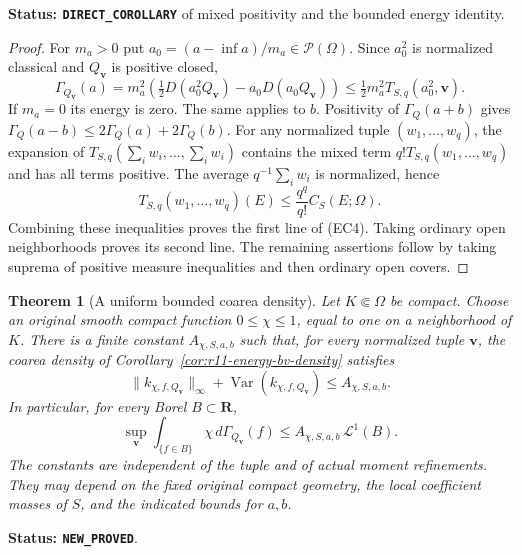 \documentclass[11pt,a4paper]{article}
\numberwithin{equation}{section}
\newtheorem{theorem}{Theorem}[section]
\theoremstyle{definition}
\theoremstyle{remark}
\begin{document}
\noindent\textbf{Status: \texttt{DIRECT\_COROLLARY}} of mixed
positivity and the bounded energy identity.

\begin{proof}
For $m_a>0$ put $a_0=(a-\inf a)/m_a\in\mathcal P(\Omega)$.
Since $a_0^2$ is normalized classical and $Q_{\mathbf v}$ is
positive closed,
\[
 \Gamma_{Q_{\mathbf v}}(a)
  =m_a^2\left(\tfrac12D(a_0^2Q_{\mathbf v})
                              -a_0D(a_0Q_{\mathbf v})\right)
  \le\tfrac12m_a^2T_{S,q}(a_0^2,\mathbf v).
\]
If $m_a=0$ its energy is zero.  The same applies to $b$.
Positivity of $\Gamma_Q(a+b)$ gives
$\Gamma_Q(a-b)\le2\Gamma_Q(a)+2\Gamma_Q(b)$.
For any normalized tuple $(w_1,\ldots,w_q)$, the expansion of
$T_{S,q}(\sum_iw_i,\ldots,\sum_iw_i)$ contains the mixed
term $q!T_{S,q}(w_1,\ldots,w_q)$ and has all terms positive.
The average $q^{-1}\sum_iw_i$ is normalized, hence
\[
 T_{S,q}(w_1,\ldots,w_q)(E)
                         \le\frac{q^q}{q!}C_S(E;\Omega).
\]
Combining these inequalities proves the first line of (EC4).
Taking ordinary open neighborhoods proves its second line.
The remaining assertions follow by taking suprema of positive
measure inequalities and then ordinary open covers.
\end{proof}

\begin{theorem}[A uniform bounded coarea density]
\label{thm:r11-uniform-coarea-density}
Let $K\Subset\Omega$ be compact.  Choose an original smooth
compact function $0\le\chi\le1$, equal to one on a neighborhood
of $K$.  There is a finite constant $A_{\chi,S,a,b}$ such that,
for every normalized tuple $\mathbf v$, the coarea density of
Corollary~\ref{cor:r11-energy-bv-density} satisfies
\[
 \|k_{\chi,f,Q_{\mathbf v}}\|_{\infty}
 +\operatorname{Var}(k_{\chi,f,Q_{\mathbf v}})
                                      \le A_{\chi,S,a,b}.
 \tag{EC5}
\]
In particular, for every Borel $B\subset\mathbf R$,
\[
 \sup_{\mathbf v}
  \int_{\{f\in B\}}\chi\,d\Gamma_{Q_{\mathbf v}}(f)
                      \le A_{\chi,S,a,b}\,\mathcal L^1(B).
 \tag{EC6}
\]
The constants are independent of the tuple and of actual
moment refinements.  They may depend on the fixed original
compact geometry, the local coefficient masses of $S$, and
the indicated bounds for $a,b$.
\end{theorem}

\noindent\textbf{Status: \texttt{NEW\_PROVED}}.
\end{document}
